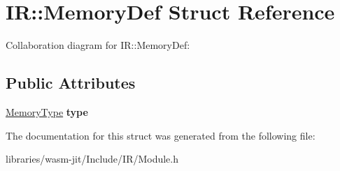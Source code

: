 \hypertarget{struct_i_r_1_1_memory_def}{}\section{IR\+:\+:Memory\+Def Struct Reference}
\label{struct_i_r_1_1_memory_def}


Collaboration diagram for IR\+:\+:Memory\+Def\+:
\subsection*{Public Attributes}
\begin{DoxyCompactItemize}
\item 
\mbox{\label{struct_i_r_1_1_memory_def_a1697fa07da31cdab48727191708922c4}} 
\mbox{\hyperlink{struct_i_r_1_1_memory_type}{Memory\+Type}} {\bfseries type}
\end{DoxyCompactItemize}


The documentation for this struct was generated from the following file\+:\begin{DoxyCompactItemize}
\item 
libraries/wasm-\/jit/\+Include/\+I\+R/Module.\+h\end{DoxyCompactItemize}
